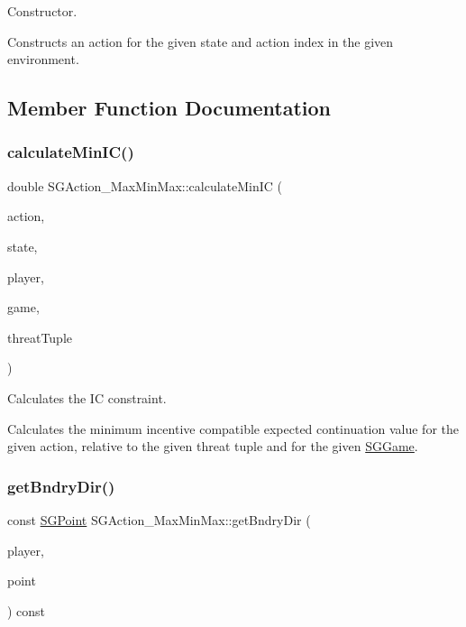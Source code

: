 Constructor. 

Constructs an action for the given state and action index in the given environment. 

\subsection{Member Function Documentation}
\mbox{\label{classSGAction__MaxMinMax_ab91331990288c649ba911c0eda28df3f}} 
\subsubsection{\texorpdfstring{calculate\+Min\+I\+C()}{calculateMinIC()}}
{\footnotesize\ttfamily double S\+G\+Action\+\_\+\+Max\+Min\+Max\+::calculate\+Min\+IC (\begin{DoxyParamCaption}\item[{int}]{action,  }\item[{int}]{state,  }\item[{int}]{player,  }\item[{const \hyperlink{classSGGame}{S\+G\+Game} \&}]{game,  }\item[{const \hyperlink{classSGTuple}{S\+G\+Tuple} \&}]{threat\+Tuple }\end{DoxyParamCaption})\hspace{0.3cm}{\ttfamily [static]}}



Calculates the IC constraint. 

Calculates the minimum incentive compatible expected continuation value for the given action, relative to the given threat tuple and for the given \hyperlink{classSGGame}{S\+G\+Game}. \mbox{\label{classSGAction__MaxMinMax_a2d4762138486ac532de10879eaa2008f}} 
\subsubsection{\texorpdfstring{get\+Bndry\+Dir()}{getBndryDir()}}
{\footnotesize\ttfamily const \hyperlink{classSGPoint}{S\+G\+Point} S\+G\+Action\+\_\+\+Max\+Min\+Max\+::get\+Bndry\+Dir (\begin{DoxyParamCaption}\item[{const int}]{player,  }\item[{const int}]{point }\end{DoxyParamCaption}) const}



